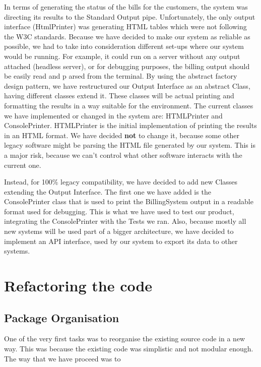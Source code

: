 \documentclass[11pt,twocolumn]{article} %
\begin{document}
In terms of generating the status of the bills for the customers, the system was directing its results to the Standard Output pipe. 
Unfortunately, the only output interface (HtmlPrinter) was generating HTML tables which were not following the W3C standards. 
Because we have decided to make our system as reliable as possible, we had to take into consideration different set-ups where our system would be running. 
For example, it could run on a server without any output attached (headless server), or for debugging purposes, 
the billing output should be easily read and p arsed from the terminal. 
By using the abstract factory design pattern, we have restructured our Output Interface as an abstract Class, 
having different classes extend it. These classes will be actual printing and formatting the results in a way suitable for the environment.
The current classes we have implemented or changed in the system are: HTMLPrinter and ConsolePrinter. HTMLPrinter is the initial implementation 
of printing the results in an HTML format. We have decided \textbf{not} to change it, because some other legacy software might be parsing the
HTML file generated by our system. This is a major risk, because we can't control what other software interacts with the current one.

Instead, for 100\% legacy compatibility, we have decided to add new Classes extending the Output Interface. 
The first one we have added is the ConsolePrinter class that is used to print the BillingSystem output in a readable format used for debugging.
This is what we have used to test our product, integrating the ConsolePrinter with the Tests we ran. Also, because mostly all new systems will be used 
part of a bigger architecture, we have decided to implement an API interface, used by our system to export its data to other systems. 




\section{Refactoring the code}

\subsection{Package Organisation}
One of the very first tasks was to reorganise the existing source code in a new way.
This was because the existing code was simplistic and not modular enough. The way that
we have proceed was to 
\end{document}
